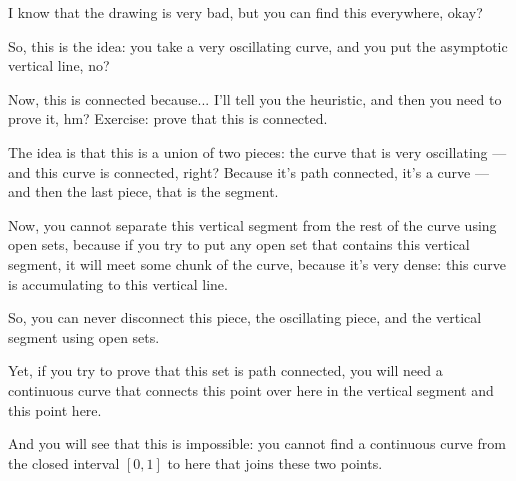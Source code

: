 \begin{content}
\begin{center}
\end{center}
\end{content}

\begin{speech}[00:47:25 - 00:49:28]
I know that the drawing is very bad, but you can find this everywhere, okay?

So, this is the idea: you take a very oscillating curve, and you put the asymptotic vertical line, no?

Now, this is connected because... I'll tell you the heuristic, and then you need to prove it, hm? Exercise: prove that this is connected.

The idea is that this is a union of two pieces: the curve that is very oscillating --- and this curve is connected, right? Because it's path connected, it's a curve --- and then the last piece, that is the segment.

Now, you cannot separate this vertical segment from the rest of the curve using open sets, because if you try to put any open set that contains this vertical segment, it will meet some chunk of the curve, because it's very dense: this curve is accumulating to this vertical line.

So, you can never disconnect this piece, the oscillating piece, and the vertical segment using open sets.

Yet, if you try to prove that this set is path connected, you will need a continuous curve that connects this point over here in the vertical segment and this point here.

And you will see that this is impossible: you cannot find a continuous curve from the closed interval $[0, 1]$ to here that joins these two points.
\end{speech}

